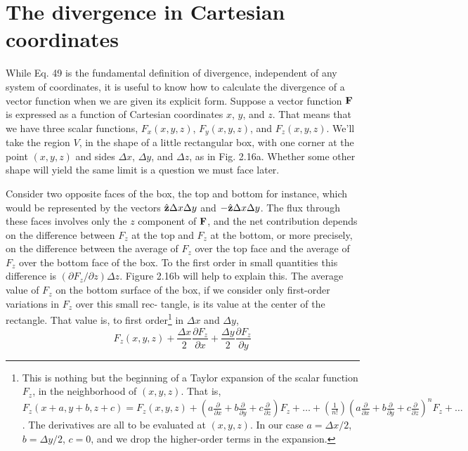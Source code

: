 \section{The divergence in Cartesian coordinates}

While Eq. 49 is the fundamental definition of divergence, independent
of any system of coordinates, it is useful to know how to
calculate the divergence of a vector function when we are given its
explicit form. Suppose a vector function $\mathbf{F}$ is expressed as a function
of Cartesian coordinates $x$, $y$, and $z$. That means that we have three
scalar functions, $F_x(x,y,z)$, $F_y(x,y,z)$, and $F_z(x,y,z)$. We'll take the
region $V$, in the shape of a little rectangular box, with one corner at
the point $(x,y,z)$ and sides $\Delta x$, $\Delta y$, and $\Delta z$, as in Fig. 2.16a. Whether
some other shape will yield the same limit is a question we must face
later.

Consider two opposite faces of the box, the top and bottom for
instance, which would be represented by the vectors $\hat{\mathbf{z}} \Delta x\Delta y$ and
$-\hat{\mathbf{z}} \Delta x\Delta y$. The flux through these faces involves only the $z$ component
of $\mathbf{F}$, and the net contribution depends on the difference between
$F_z$ at the top and $F_z$ at the bottom, or more precisely, on the
difference between the average of $F_z$ over the top face and the average
of $F_z$ over the bottom face of the box. To the first order in small
quantities this difference is $(\partial F_z/\partial z)\Delta z$. Figure 2.16b will help to explain
this. The average value of $F_z$ on the bottom surface of the box,
if we consider only first-order variations in $F_z$ over this small rec-
tangle, is its value at the center of the rectangle. That value is, to
first order\footnote{
This is nothing but the beginning of a Taylor expansion of the scalar function $F_z$,
in the neighborhood of $(x,y,z)$. That is, $F_z(x + a, y + b, z + c) =
F_z(x,y,z) +(a\frac{\partial}{\partial x}+b\frac{\partial}{\partial y}+c\frac{\partial}{\partial z})F_z
+\ldots+\left(\frac{1}{n!}\right)
  (a\frac{\partial}{\partial x}+b\frac{\partial}{\partial y}+c\frac{\partial}{\partial z})^nF_z
+\ldots$. The derivatives are
all to be evaluated at $(x,y,z)$. In our case $a=\Delta x/2$, $b=\Delta y/2$, $c=0$,
and we drop the higher-order terms in the 
expansion.} in $\Delta x$ and $\Delta y$,
\begin{equation}
  F_z(x,y,z)+\frac{\Delta x}{2}\frac{\partial F_z}{\partial x}
            +\frac{\Delta y}{2}\frac{\partial F_z}{\partial y}
\end{equation}


